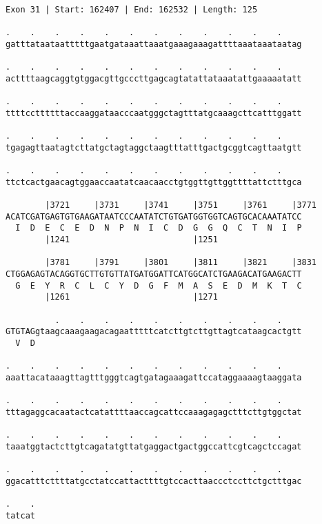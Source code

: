 \documentclass{article}
\begin{document}
\begin{Verbatim}
Exon 31 | Start: 162407 | End: 162532 | Length: 125
 
.    .    .    .    .    .    .    .    .    .    .    .    
gatttataataatttttgaatgataaattaaatgaaagaaagattttaaataaataatag
  
.    .    .    .    .    .    .    .    .    .    .    .    
acttttaagcaggtgtggacgttgcccttgagcagtatattataaatattgaaaaatatt
  
.    .    .    .    .    .    .    .    .    .    .    .    
ttttccttttttaccaaggataacccaatgggctagtttatgcaaagcttcatttggatt
  
.    .    .    .    .    .    .    .    .    .    .    .    
tgagagttaatagtcttatgctagtaggctaagtttatttgactgcggtcagttaatgtt
  
.    .    .    .    .    .    .    .    .    .    .    .    
ttctcactgaacagtggaaccaatatcaacaacctgtggttgttggttttattctttgca
  
        |3721     |3731     |3741     |3751     |3761     |3771
ACATCGATGAGTGTGAAGATAATCCCAATATCTGTGATGGTGGTCAGTGCACAAATATCC
  I  D  E  C  E  D  N  P  N  I  C  D  G  G  Q  C  T  N  I  P
        |1241                         |1251                 
  
        |3781     |3791     |3801     |3811     |3821     |3831
CTGGAGAGTACAGGTGCTTGTGTTATGATGGATTCATGGCATCTGAAGACATGAAGACTT
  G  E  Y  R  C  L  C  Y  D  G  F  M  A  S  E  D  M  K  T  C
        |1261                         |1271                 
  
          .    .    .    .    .    .    .    .    .    .    
GTGTAGgtaagcaaagaagacagaatttttcatcttgtcttgttagtcataagcactgtt
  V  D                                                      
  
.    .    .    .    .    .    .    .    .    .    .    .    
aaattacataaagttagtttgggtcagtgatagaaagattccataggaaaagtaaggata
  
.    .    .    .    .    .    .    .    .    .    .    .    
tttagaggcacaatactcatattttaaccagcattccaaagagagctttcttgtggctat
  
.    .    .    .    .    .    .    .    .    .    .    .    
taaatggtactcttgtcagatatgttatgaggactgactggccattcgtcagctccagat
  
.    .    .    .    .    .    .    .    .    .    .    .    
ggacatttcttttatgcctatccattacttttgtccacttaaccctccttctgctttgac
  
.    .
tatcat
\end{Verbatim}
\newpage
\end{document}
